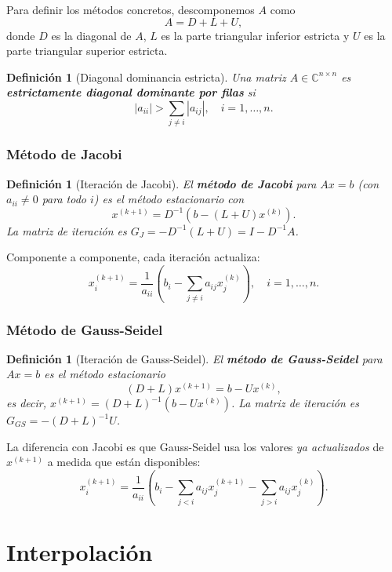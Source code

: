 \documentclass[a4paper,11pt]{report}
\newtheorem{definition}[theorem]{Definición}
\begin{document}
Para definir los métodos concretos, descomponemos $A$ como
\[
A = D + L + U,
\]
donde $D$ es la diagonal de $A$, $L$ es la parte triangular inferior estricta y $U$ es la parte triangular superior estricta.

\begin{definition}[Diagonal dominancia estricta]\label{def:diag_dominante}
Una matriz $A \in \mathbb{C}^{n \times n}$ es \textbf{estrictamente diagonal dominante por filas} si
\[
|a_{ii}| > \sum_{j \neq i} |a_{ij}|, \quad i = 1, \ldots, n.
\]
\end{definition}

\subsection{Método de Jacobi}

\begin{definition}[Iteración de Jacobi]
El \textbf{método de Jacobi} para $Ax = b$ (con $a_{ii} \neq 0$ para todo $i$) es el método estacionario con
\[
x^{(k+1)} = D^{-1}(b - (L+U)x^{(k)}).
\]
La matriz de iteración es $G_J = -D^{-1}(L+U) = I - D^{-1}A$.
\end{definition}

Componente a componente, cada iteración actualiza:
\[
x_i^{(k+1)} = \frac{1}{a_{ii}}\left(b_i - \sum_{j \neq i} a_{ij} x_j^{(k)}\right), \quad i = 1, \ldots, n.
\]

\subsection{Método de Gauss-Seidel}

\begin{definition}[Iteración de Gauss-Seidel]
El \textbf{método de Gauss-Seidel} para $Ax = b$ es el método estacionario
\[
(D + L) x^{(k+1)} = b - U x^{(k)},
\]
es decir, $x^{(k+1)} = (D+L)^{-1}(b - Ux^{(k)})$.
La matriz de iteración es $G_{GS} = -(D+L)^{-1}U$.
\end{definition}

La diferencia con Jacobi es que Gauss-Seidel usa los valores \emph{ya actualizados} de $x^{(k+1)}$ a medida que están disponibles:
\[
x_i^{(k+1)} = \frac{1}{a_{ii}}\left(b_i - \sum_{j < i} a_{ij} x_j^{(k+1)} - \sum_{j > i} a_{ij} x_j^{(k)}\right).
\]


\chapter{Interpolación}
\end{document}
